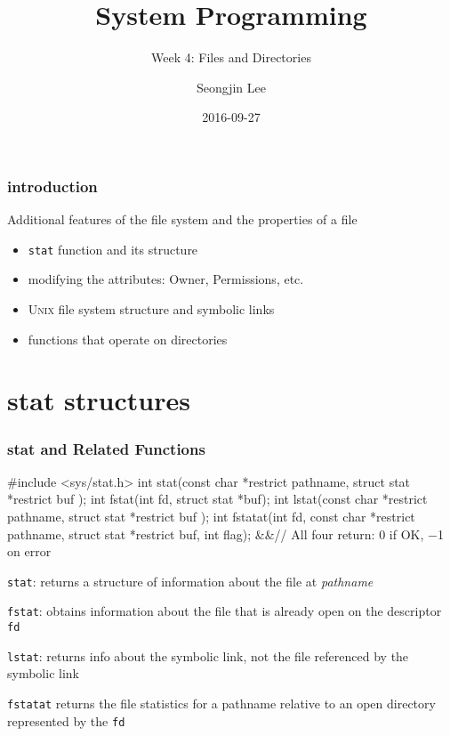 \documentclass[newPxFont,sthlmFooter,nooffset]{beamer}
\title{System Programming}
\subtitle{Week 4: Files and Directories}
\author[SJL]{Seongjin Lee}
\institute{\href{mailto:insight@hanyang.ac.kr}{insight@hanyang.ac.kr}\\\url{http://esos.hanyang.ac.kr}\\Esos Lab. Hanyang University}
\date{2016-09-27}
\begin{document}
\frame[plain]{\titlepage} 




\begin{frame}[t]
  \frametitle{introduction}
Additional features of the file system and the properties of a file
\begin{itemize}
\item \texttt{stat} function and its structure
\item modifying the attributes: Owner, Permissions, etc.
\item \textsc{Unix} file system structure and symbolic links
\item functions that operate on directories
\end{itemize}
\end{frame}

\section{stat structures}

\begin{frame}[containsverbatim,t]
  \frametitle{stat and Related Functions}
\begin{codedef}
#include <sys/stat.h>
int stat(const char *restrict pathname, struct stat *restrict buf );
int fstat(int fd, struct stat *buf);
int lstat(const char *restrict pathname, struct stat *restrict buf );
int fstatat(int fd, const char *restrict pathname, struct stat *restrict buf, int flag);
&&\hfill // All four return: 0 if OK, −1 on error 
\end{codedef}

\texttt{stat}: returns a structure of information about the file at \textit{pathname}

\texttt{fstat}: obtains information about the file that is already open on the descriptor \texttt{fd}

\texttt{lstat}: returns info about the symbolic link, not the file referenced by the symbolic link

\texttt{fstatat} returns the file statistics for a pathname relative to an open directory represented by the \texttt{fd}

\end{frame}
\end{document}

